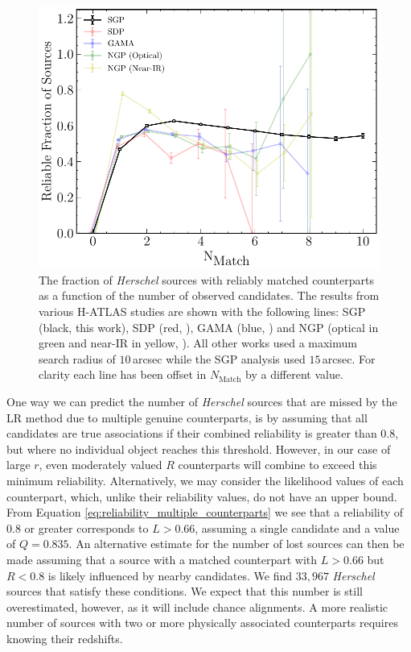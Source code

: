 \begin{figure}
    \centering
    \includegraphics[width=0.67\columnwidth]{Figures/Figure_2_6.pdf}
    \caption[Reliable fraction of sources as a function of the number of candidates]{The fraction of \textit{Herschel} sources with reliably matched counterparts as a function of the number of observed candidates. The results from various H-ATLAS studies are shown with the following lines: SGP (black, this work), SDP (red, \citealt{Smith_2011}), GAMA (blue, \citealt{Bourne_2016}) and NGP (optical in green and near-IR in yellow, \citealt{Furlanetto_2018}). All other works used a maximum search radius of $10\,$arcsec while the SGP analysis used $15\,$arcsec. For clarity each line has been offset in $N_{\textrm{Match}}$ by a different value.}
    \label{fig:multiplicity}
\end{figure}

One way we can predict the number of \textit{Herschel} sources that are missed by the LR method due to multiple genuine counterparts, is by assuming that all candidates are true associations if their combined reliability is greater than $0.8$, but where no individual object reaches this threshold. However, in our case of large $r$, even moderately valued $R$ counterparts will combine to exceed this minimum reliability. Alternatively, we may consider the likelihood values of each counterpart, which, unlike their reliability values, do not have an upper bound. From Equation \ref{eq:reliability_multiple_counterparts} we see that a reliability of $0.8$ or greater corresponds to $L > 0.66$, assuming a single candidate and a value of $Q = 0.835$. An alternative estimate for the number of lost sources can then be made assuming that a source with a matched counterpart with $L > 0.66$ but $R < 0.8$ is likely influenced by nearby candidates. We find $33,967$ \textit{Herschel} sources that satisfy these conditions. We expect that this number is still overestimated, however, as it will include chance alignments. A more realistic number of sources with two or more physically associated counterparts requires knowing their redshifts.

